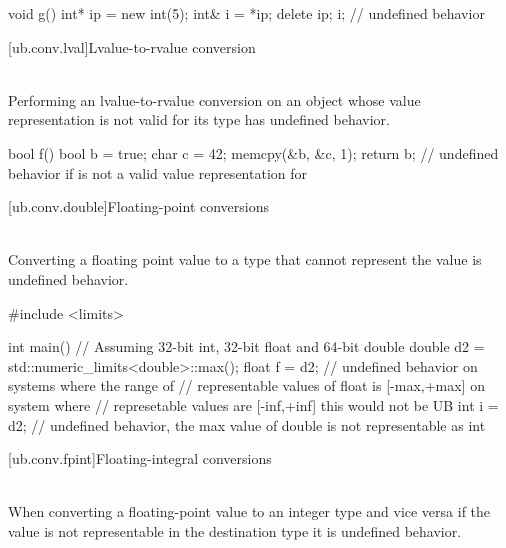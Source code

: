 \pnum
\begin{example}
\begin{codeblock}
void g()
{
  int* ip = new int(5);
  int& i = *ip;
  delete ip;
  i;    // undefined behavior
}
\end{codeblock}
\end{example}

[ub.conv.lval]{Lvalue-to-rvalue conversion}

\pnum
{} \\
Performing an
lvalue-to-rvalue conversion
on an object whose
value representation
is not valid for its type
has undefined behavior.

\pnum
\begin{example}
\begin{codeblock}
bool f() {
  bool b = true;
  char c = 42;
  memcpy(&b, &c, 1);
  return b;         // undefined behavior if  is not a valid value representation for 
}
\end{codeblock}
\end{example}


[ub.conv.double]{Floating-point conversions}

\pnum
{} \\
Converting a floating point value to a type that cannot represent the value is undefined behavior.

\pnum
\begin{example}
\begin{codeblock}
#include <limits>

int main() {
  // Assuming 32-bit int, 32-bit float and 64-bit double
  double d2 = std::numeric_limits<double>::max();
  float f = d2; // undefined behavior on systems where the range of
                // representable values of float is [-max,+max] on system where
                // represetable values are [-inf,+inf] this would not be UB
  int i = d2;   // undefined behavior, the max value of double is not representable as int
}
\end{codeblock}
\end{example}


[ub.conv.fpint]{Floating-integral conversions}

\pnum
{} \\
When converting a floating-point value to an integer type and vice versa if
the value is not representable in the destination type it is undefined behavior.

